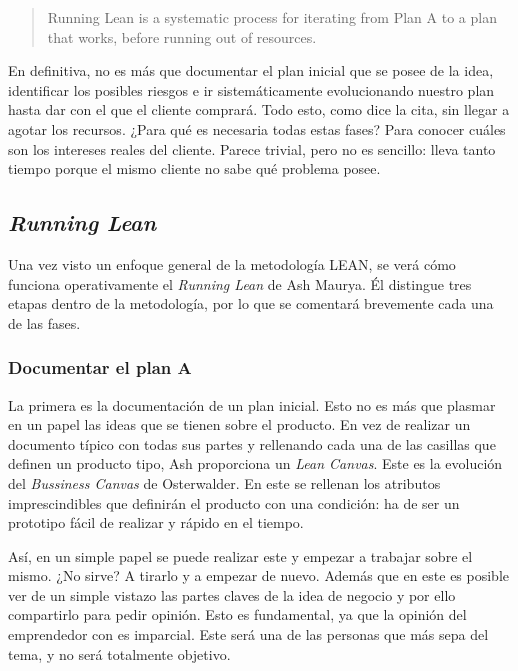 \begin{quote}
	\small Running Lean is a systematic process for iterating from Plan A to a plan that works, before running out of resources.
	\begin{flushright}
	\end{flushright}
\end{quote}

En definitiva, no es más que documentar el plan inicial que se posee de la idea, identificar los posibles riesgos e ir sistemáticamente evolucionando nuestro plan hasta dar con el que el cliente comprará. Todo esto, como dice la cita, sin llegar a agotar los recursos. ¿Para qué es necesaria todas estas fases? Para conocer cuáles son los intereses reales del cliente. Parece trivial, pero no es sencillo: lleva tanto tiempo porque el mismo cliente no sabe qué problema posee.

\subsection{\textit{Running Lean}}

Una vez visto un enfoque general de la metodología LEAN, se verá cómo funciona operativamente el \textit{Running Lean} de Ash Maurya. Él distingue tres etapas dentro de la metodología, por lo que se comentará brevemente cada una de las fases.


\subsubsection{Documentar el plan A}

La primera es la documentación de un plan inicial. Esto no es más que plasmar en un papel las ideas que se tienen sobre el producto. En vez de realizar un documento típico con todas sus partes y rellenando cada una de las casillas que definen un producto tipo, Ash proporciona un \textit{Lean Canvas}. Este es la evolución del \textit{Bussiness Canvas} de Osterwalder. En este se rellenan los atributos imprescindibles que definirán el producto con una condición: ha de ser un prototipo fácil de realizar y rápido en el tiempo.

Así, en un simple papel se puede realizar este y empezar a trabajar sobre el mismo. ¿No sirve? A tirarlo y a empezar de nuevo. Además que en este es posible ver de un simple vistazo las partes claves de la idea de negocio y por ello compartirlo para pedir opinión. Esto es fundamental, ya que la opinión del emprendedor con es imparcial. Este será una de las personas que más sepa del tema, y no será totalmente objetivo.

